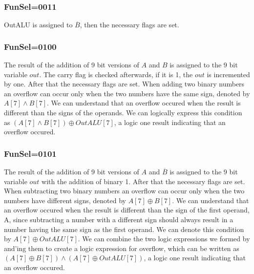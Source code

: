 \documentclass[pdftex,12pt,a4paper]{article}
\begin{document}
\subsubsection{FunSel=0011}
OutALU is assigned to $\overline{B}$, then the necessary flags are set.
\subsubsection{FunSel=0100}
The result of the addition of 9 bit versions of $A$ and $B$ is assigned to the 9 bit variable $out$. The carry flag is checked 
afterwards, if it is 1, the $out$ is incremented by one. After that the necessary flags are set.
\newline
When adding two binary numbers an overflow can occur only when the two numbers have the same sign, denoted by $A[7]\land B[7]$. 
We can understand that an overflow occured when the result is different than the signs of the operands. We can logically express this 
condition as $(A[7]\land B[7])\oplus {OutALU[7]}$, a logic one result indicating that an overflow occured.
\subsubsection{FunSel=0101}
The result of the addition of 9 bit versions of $A$ and $\overline{B}$ is assigned to the 9 bit variable $out$ with the addition of
binary 1. After that the necessary flags are set.
\newline
When subtracting two binary numbers an overflow can occur only when the two numbers have different signs, denoted by $A[7]\oplus {B[7]}$.
We can understand that an overflow occured when the result is different than the sign of the first operand, A, since subtracting 
a number with a different sign should always result in a number having the same sign as the first operand. We can denote this 
condition by $A[7]\oplus {OutALU[7]}$. We can combine the two logic expressions we formed by and'ing them to create a logic expression 
for overflow, which can be written as $(A[7]\oplus {B[7]})\land(A[7]\oplus {OutALU[7]})$, a logic one result indicating that an 
overflow occured. 
\end{document}
